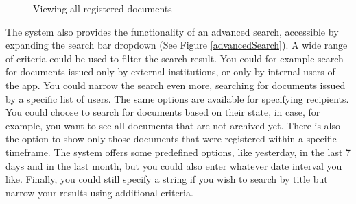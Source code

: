 \begin{figure}[ht]
    \centering
    \qquad
    \caption{Viewing all registered documents}
    \label{documentsTable}
\end{figure}

The system also provides the functionality of an advanced search, accessible by expanding the search bar dropdown (See Figure \ref{advancedSearch}). A wide range of criteria could be used to filter the search result. You could for example search for documents issued only by external institutions, or only by internal users of the app. You could narrow the search even more, searching for documents issued by a specific list of users. The same options are available for specifying recipients. You could choose to search for documents based on their state, in case, for example, you want to see all documents that are not archived yet. There is also the option to show only those documents that were registered within a specific timeframe. The system offers some predefined options, like yesterday, in the last 7 days and in the last month, but you could also enter whatever date interval you like. Finally, you could still specify a string if you wish to search by title but narrow your results using additional criteria.

